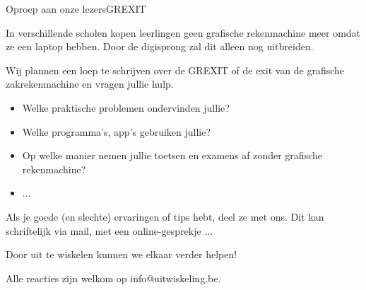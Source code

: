 	\begin{kader}{Oproep aan onze lezers}{GREXIT}
	
		In verschillende scholen kopen leerlingen geen grafische rekenmachine meer omdat ze een laptop hebben. Door de digisprong zal dit alleen nog uitbreiden. 
		
		Wij plannen een loep te schrijven over de GREXIT of de exit van de grafische zakrekenmachine en vragen jullie hulp.
		\begin{itemize}
		\item Welke praktische problemen ondervinden jullie?
		\item Welke programma's, app's gebruiken jullie? 
		\item Op welke manier nemen jullie toetsen en examens af zonder grafische rekenmachine?
		\item ...
		\end{itemize}
	
		Als je goede (en slechte) ervaringen of tips hebt, deel ze met ons. Dit kan schriftelijk via mail, met een online-gesprekje ... 
		
		Door uit te wiskelen kunnen we elkaar verder helpen!
		
		Alle reacties zijn welkom op info@uitwiskeling.be.
	\end{kader}
	
	

